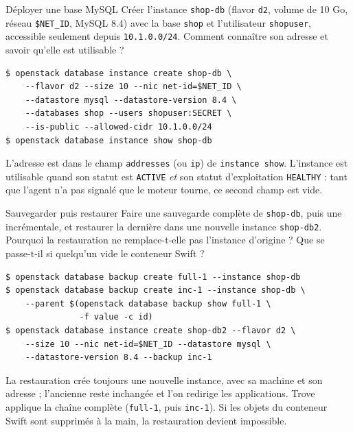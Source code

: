 \begin{exercice}{Déployer une base MySQL}\label{ex:tr-deployer}
Créer l'instance \texttt{shop-db} (flavor \texttt{d2}, volume de 10 Go, réseau \texttt{\$NET\_ID}, MySQL 8.4) avec la base \texttt{shop}
et l'utilisateur \texttt{shopuser}, accessible seulement depuis \texttt{10.1.0.0/24}. Comment connaître son adresse et savoir qu'elle
est utilisable ?
\end{exercice}
\begin{correction}
\begin{lstlisting}
$ openstack database instance create shop-db \
    --flavor d2 --size 10 --nic net-id=$NET_ID \
    --datastore mysql --datastore-version 8.4 \
    --databases shop --users shopuser:SECRET \
    --is-public --allowed-cidr 10.1.0.0/24
$ openstack database instance show shop-db
\end{lstlisting}
L'adresse est dans le champ \texttt{addresses} (ou \texttt{ip}) de \texttt{instance show}. L'instance est utilisable quand son statut est
\texttt{ACTIVE} \emph{et} son statut d'exploitation \texttt{HEALTHY} : tant que l'agent n'a pas signalé que le moteur tourne, ce second champ est vide.
\end{correction}

\begin{exercice}{Sauvegarder puis restaurer}\label{ex:tr-sauv}
Faire une sauvegarde complète de \texttt{shop-db}, puis une incrémentale, et restaurer la dernière dans une nouvelle instance
\texttt{shop-db2}. Pourquoi la restauration ne remplace-t-elle pas l'instance d'origine ? Que se passe-t-il si quelqu'un vide le conteneur
Swift ?
\end{exercice}
\newpage
\begin{correction}
\begin{lstlisting}
$ openstack database backup create full-1 --instance shop-db
$ openstack database backup create inc-1 --instance shop-db \
    --parent $(openstack database backup show full-1 \
               -f value -c id)
$ openstack database instance create shop-db2 --flavor d2 \
    --size 10 --nic net-id=$NET_ID --datastore mysql \
    --datastore-version 8.4 --backup inc-1
\end{lstlisting}
La restauration crée toujours une nouvelle instance, avec sa machine et son adresse ; l'ancienne reste inchangée et l'on redirige les
applications. Trove applique la chaîne complète (\texttt{full-1}, puis \texttt{inc-1}). Si les objets du conteneur Swift sont supprimés à la
main, la restauration devient impossible.
\end{correction}

